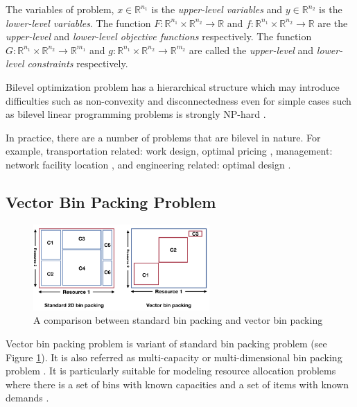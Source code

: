 The variables of problem, $x \in \mathbb{R}^{n_1}$ is the \emph{upper-level variables} and $y \in \mathbb{R}^{n_2}$ is the \emph{lower-level variables}. The function $F : \mathbb{R}^{n_1} \times  \mathbb{R}^{n_2} \to \mathbb{R}$ and $f : \mathbb{R}^{n_1} \times  \mathbb{R}^{n_2} \to \mathbb{R}$ are the \emph{upper-level} and \emph{lower-level objective functions} respectively. The function $G : \mathbb{R}^{n_1} \times  \mathbb{R}^{n_2} \to \mathbb{R}^{m_1}$ and $g : \mathbb{R}^{n_1} \times  \mathbb{R}^{n_2} \to \mathbb{R}^{m_2}$ are called the \emph{upper-level} and \emph{lower-level constraints} respectively. 

Bilevel optimization problem has a hierarchical structure which may introduce difficulties such as non-convexity and disconnectedness even for simple cases such as bilevel linear programming problems is strongly NP-hard \cite{:2013tn}. 

In practice, there are a number of problems that are bilevel in nature. For example, transportation related: work design, optimal pricing \cite{Brotcorne:2001je, Constantin:1995hu}, management: network facility location \cite{Sun:2008gq},  and engineering related: optimal design \cite{KirjnerNeto:1998ef}. 

\subsection{Vector Bin Packing Problem}
\label{vector_bin_packing}

\begin{figure}
	\centering
	\includegraphics[width=0.6\textwidth]{pics/bin_packing_problem.png}
	\caption{A comparison between standard bin packing and vector bin packing}
	\label{fig:bin_packing_problem}
\end{figure}

Vector bin packing problem is variant of standard bin packing problem (see Figure \ref{fig:bin_packing_problem}). It is also referred as multi-capacity \cite{Leinberger:1999fs} or multi-dimensional bin packing problem \cite{Xiong:2014jq}. It is particularly suitable for modeling resource allocation problems where there is a set of bins with known capacities and a set of items with known demands \cite{Panigrahy:2011wk}. 

